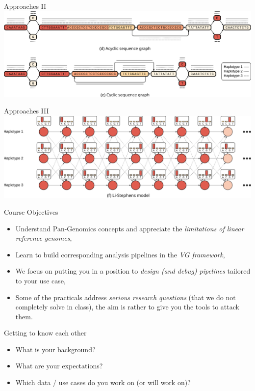 \documentclass[notes=hide]{beamer}
\newcommand{\0}{\ensuremath{\mathtt{0}}}
\newcommand{\1}{\ensuremath{\mathtt{1}}}
\begin{document}
\begin{frame}{Approaches II}
\includegraphics[width=.95\textwidth]{figs/paper/data_structures2}
\end{frame}

\begin{frame}{Approaches III}
\includegraphics[width=.95\textwidth]{figs/paper/data_structures3}
\end{frame}

\begin{frame}{Course Objectives}
\begin{itemize}
 \item Understand Pan-Genomics concepts and appreciate the \emph{limitations of linear reference genomes},
 \item Learn to build corresponding analysis pipelines in the \emph{VG framework},
 \item We focus on putting you in a position to \emph{design (and debug) pipelines} tailored to your use case,
 \item Some of the practicals address \emph{serious research questions} (that we do not completely solve in class), the aim is rather to give you the tools to attack them.
\end{itemize}
\end{frame}


\begin{frame}{Getting to know each other}
\begin{itemize}
  \item What is your background?
  \item What are your expectations?
  \item Which data / use cases do you work on (or will work on)?
\end{itemize}
\end{frame}
\end{document}
